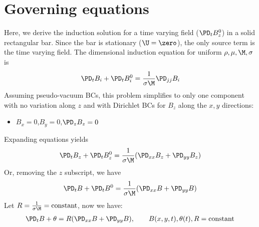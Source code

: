 \documentclass[11pt]{article}
\begin{document}
\MOONSTITLE
\maketitle
\section{Governing equations}
Here, we derive the induction solution for a time varying field ($\PD_t B_z^0$) in a solid rectangular bar. Since the bar is stationary ($\U=\zero$), the only source term is the time varying field. The dimensional induction equation for uniform $\rho,\mu,\M,\sigma$ is
\begin{equation}\begin{aligned}
\PD_t B_i + \PD_t B_i^0 = \frac{1}{\sigma \M} \PD_{jj} B_i
\end{aligned} \end{equation}
Assuming pseudo-vacuum BCs, this problem simplifies to only one component with no variation along $z$ and with Dirichlet BCs for $B_z$ along the $x,y$ directions:
\begin{itemize}\setlength\itemsep{-1em}
	\item $B_x=0$,$B_y=0$,$\PD_z B_z = 0$
\end{itemize}
Expanding equations yields
\begin{equation}\begin{aligned}
\PD_t B_z + \PD_t B_z^0 = \frac{1}{\sigma \M} (\PD_{xx} B_z + \PD_{yy} B_z) \\
\end{aligned} \end{equation}
Or, removing the $z$ subscript, we have
\begin{equation}\begin{aligned}
\PD_t B + \PD_t B^0 = \frac{1}{\sigma \M} (\PD_{xx} B + \PD_{yy} B) \\
\end{aligned} \end{equation}
Let $R = \frac{1}{\sigma \M} = \text{constant}$, now we have:
\begin{equation}\begin{aligned}
\PD_t B + \theta = R (\PD_{xx} B + \PD_{yy} B), \qquad B(x,y,t),\theta(t),R=\text{constant} \\
\end{aligned} \end{equation}
\end{document}

